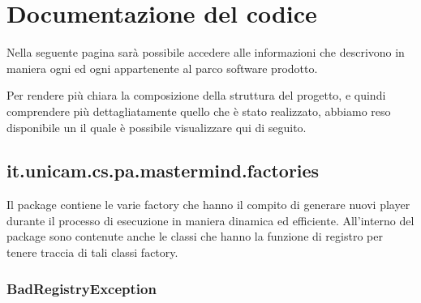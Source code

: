 \documentclass[letterpaper,10pt,italian,openany,oneside]{sphinxmanual}
\begin{document}
\chapter{Documentazione del codice}
\label{\detokenize{source/packages:documentazione-del-codice}}\label{\detokenize{source/packages::doc}}
Nella seguente pagina sarà possibile accedere alle informazioni che descrivono in maniera  ogni
 ed ogni  appartenente al parco software prodotto.

Per rendere più chiara la composizione della struttura del progetto, e quindi comprendere più dettagliatamente quello
che è stato realizzato, abbiamo reso disponibile un  il quale è possibile visualizzare qui di seguito.

\noindent{}


\section{it.unicam.cs.pa.mastermind.factories}
\label{\detokenize{source/it/unicam/cs/pa/mastermind/factories/package-index:it-unicam-cs-pa-mastermind-factories}}\label{\detokenize{source/it/unicam/cs/pa/mastermind/factories/package-index::doc}}
Il package contiene le varie factory che hanno il compito di generare nuovi player durante il processo di esecuzione in maniera dinamica ed efficiente. All’interno del package sono contenute anche le classi che hanno la funzione di registro per tenere traccia di tali classi factory.

\label{\detokenize{source/it/unicam/cs/pa/mastermind/factories/package-index:package-it.unicam.cs.pa.mastermind.factories}}

\subsection{BadRegistryException}
\label{\detokenize{source/it/unicam/cs/pa/mastermind/factories/BadRegistryException:badregistryexception}}\label{\detokenize{source/it/unicam/cs/pa/mastermind/factories/BadRegistryException::doc}}
\end{document}
